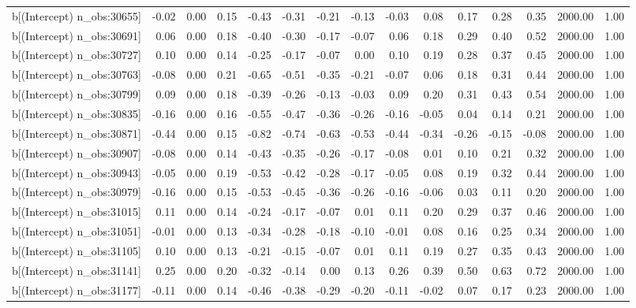 \begin{table}[ht]
\begin{tabular}{rrrrrrrrrrrrrrr}
  b[(Intercept) n\_obs:30655] & -0.02 & 0.00 & 0.15 & -0.43 & -0.31 & -0.21 & -0.13 & -0.03 & 0.08 & 0.17 & 0.28 & 0.35 & 2000.00 & 1.00 \\ 
  b[(Intercept) n\_obs:30691] & 0.06 & 0.00 & 0.18 & -0.40 & -0.30 & -0.17 & -0.07 & 0.06 & 0.18 & 0.29 & 0.40 & 0.52 & 2000.00 & 1.00 \\ 
  b[(Intercept) n\_obs:30727] & 0.10 & 0.00 & 0.14 & -0.25 & -0.17 & -0.07 & 0.00 & 0.10 & 0.19 & 0.28 & 0.37 & 0.45 & 2000.00 & 1.00 \\ 
  b[(Intercept) n\_obs:30763] & -0.08 & 0.00 & 0.21 & -0.65 & -0.51 & -0.35 & -0.21 & -0.07 & 0.06 & 0.18 & 0.31 & 0.44 & 2000.00 & 1.00 \\ 
  b[(Intercept) n\_obs:30799] & 0.09 & 0.00 & 0.18 & -0.39 & -0.26 & -0.13 & -0.03 & 0.09 & 0.20 & 0.31 & 0.43 & 0.54 & 2000.00 & 1.00 \\ 
  b[(Intercept) n\_obs:30835] & -0.16 & 0.00 & 0.16 & -0.55 & -0.47 & -0.36 & -0.26 & -0.16 & -0.05 & 0.04 & 0.14 & 0.21 & 2000.00 & 1.00 \\ 
  b[(Intercept) n\_obs:30871] & -0.44 & 0.00 & 0.15 & -0.82 & -0.74 & -0.63 & -0.53 & -0.44 & -0.34 & -0.26 & -0.15 & -0.08 & 2000.00 & 1.00 \\ 
  b[(Intercept) n\_obs:30907] & -0.08 & 0.00 & 0.14 & -0.43 & -0.35 & -0.26 & -0.17 & -0.08 & 0.01 & 0.10 & 0.21 & 0.32 & 2000.00 & 1.00 \\ 
  b[(Intercept) n\_obs:30943] & -0.05 & 0.00 & 0.19 & -0.53 & -0.42 & -0.28 & -0.17 & -0.05 & 0.08 & 0.19 & 0.32 & 0.44 & 2000.00 & 1.00 \\ 
  b[(Intercept) n\_obs:30979] & -0.16 & 0.00 & 0.15 & -0.53 & -0.45 & -0.36 & -0.26 & -0.16 & -0.06 & 0.03 & 0.11 & 0.20 & 2000.00 & 1.00 \\ 
  b[(Intercept) n\_obs:31015] & 0.11 & 0.00 & 0.14 & -0.24 & -0.17 & -0.07 & 0.01 & 0.11 & 0.20 & 0.29 & 0.37 & 0.46 & 2000.00 & 1.00 \\ 
  b[(Intercept) n\_obs:31051] & -0.01 & 0.00 & 0.13 & -0.34 & -0.28 & -0.18 & -0.10 & -0.01 & 0.08 & 0.16 & 0.25 & 0.34 & 2000.00 & 1.00 \\ 
  b[(Intercept) n\_obs:31105] & 0.10 & 0.00 & 0.13 & -0.21 & -0.15 & -0.07 & 0.01 & 0.11 & 0.19 & 0.27 & 0.35 & 0.43 & 2000.00 & 1.00 \\ 
  b[(Intercept) n\_obs:31141] & 0.25 & 0.00 & 0.20 & -0.32 & -0.14 & 0.00 & 0.13 & 0.26 & 0.39 & 0.50 & 0.63 & 0.72 & 2000.00 & 1.00 \\ 
  b[(Intercept) n\_obs:31177] & -0.11 & 0.00 & 0.14 & -0.46 & -0.38 & -0.29 & -0.20 & -0.11 & -0.02 & 0.07 & 0.17 & 0.23 & 2000.00 & 1.00 \\ 

\end{tabular}
\end{table}
